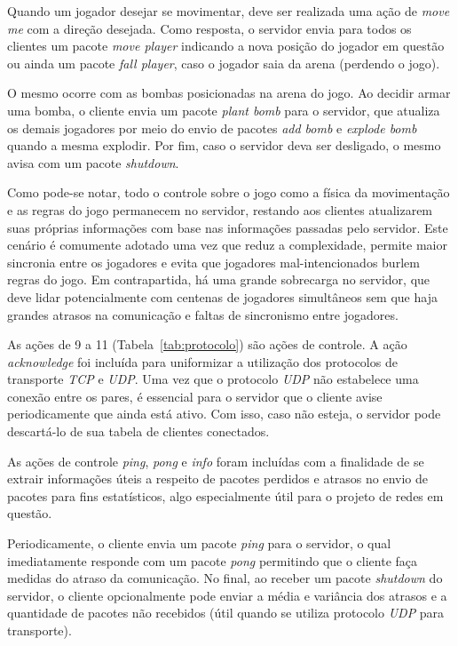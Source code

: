\documentclass[12pt]{article}
\begin{document}
Quando um jogador desejar se movimentar, deve ser realizada uma ação de \emph{move
me} com a direção desejada. Como resposta, o servidor envia para todos os
clientes um pacote \textit{move player} indicando a nova posição do jogador em
questão ou ainda um pacote \textit{fall player}, caso o jogador saia da arena
(perdendo o jogo).

O mesmo ocorre com as bombas posicionadas na arena do jogo. Ao decidir armar
uma bomba, o cliente envia um pacote \textit{plant bomb} para o servidor, que
atualiza os demais jogadores por meio do envio de pacotes \emph{add bomb} e \emph{explode
bomb} quando a mesma explodir. Por fim, caso o servidor deva ser desligado, o
mesmo avisa com um pacote \textit{shutdown}.

Como pode-se notar, todo o controle sobre o jogo como a física da movimentação
e as regras do jogo permanecem no servidor, restando aos clientes atualizarem
suas próprias informações com base nas informações passadas pelo servidor. Este
cenário é comumente adotado uma vez que reduz a complexidade, permite maior
sincronia entre os jogadores e evita que jogadores mal-intencionados burlem
regras do jogo. Em contrapartida, há uma grande sobrecarga no servidor, que
deve lidar potencialmente com centenas de jogadores simultâneos sem que haja
grandes atrasos na comunicação e faltas de sincronismo entre jogadores.

As ações de 9 a 11 (Tabela~\ref{tab:protocolo}) são ações de controle. A ação
\textit{acknowledge} foi incluída para uniformizar a utilização dos protocolos
de transporte \emph{TCP} e \emph{UDP}. Uma vez que o protocolo \emph{UDP} não estabelece uma
conexão entre os pares, é essencial para o servidor que o cliente avise
periodicamente que ainda está ativo. Com isso, caso não esteja, o servidor pode
descartá-lo de sua tabela de clientes conectados.

As ações de controle \textit{ping}, \textit{pong} e \textit{info} foram
incluídas com a finalidade de se extrair informações úteis a respeito de
pacotes perdidos e atrasos no envio de pacotes para fins estatísticos, algo
especialmente útil para o projeto de redes em questão.

Periodicamente, o cliente envia um pacote \textit{ping} para o servidor, o qual
imediatamente responde com um pacote \textit{pong} permitindo que o cliente
faça medidas do atraso da comunicação. No final, ao receber um pacote
\textit{shutdown} do servidor, o cliente opcionalmente pode enviar a média e
variância dos atrasos e a quantidade de pacotes não recebidos (útil quando
se utiliza protocolo \emph{UDP} para transporte).
\end{document}
